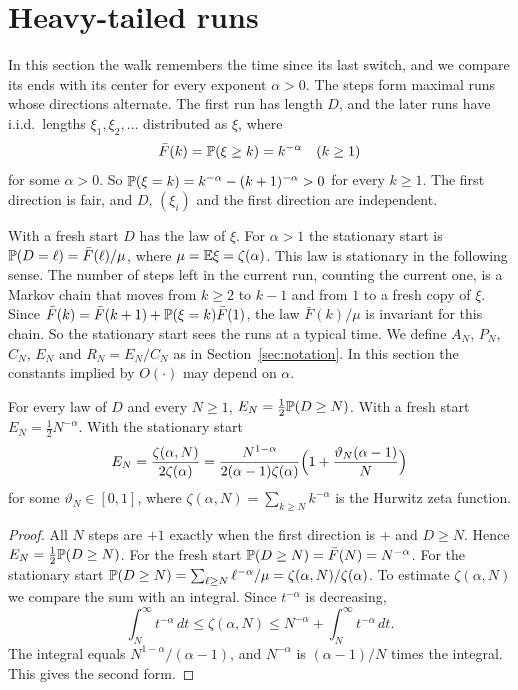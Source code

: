 \section{Heavy-tailed runs}\label{sec:heavy}

In this section the walk remembers the time since its last switch, and we
compare its ends with its center for every exponent $\alpha>0$. The steps
form maximal runs whose directions alternate. The first run has length $D$,
and the later runs have i.i.d.\ lengths $\xi_1,\xi_2,\dots$ distributed as
$\xi$, where
\[
 \bar F(k)=\mathbb{P}(\xi\ge k)=k^{-\alpha}\quad(k\ge1)
\]
for some $\alpha>0$. So $\mathbb{P}(\xi=k)=k^{-\alpha}-(k+1)^{-\alpha}>0$ for every
$k\ge1$. The first direction is fair, and $D$, $(\xi_i)$ and the first
direction are independent.

With a fresh start $D$ has the law of $\xi$. For
$\alpha>1$ the stationary start is $\mathbb{P}(D=\ell)=\bar F(\ell)/\mu$, where
$\mu=\mathbb{E}\xi=\zeta(\alpha)$. This law is stationary in the following sense. The
number of steps left in the current run, counting the current one, is a Markov
chain that moves from $k\ge2$ to $k-1$ and from $1$ to a fresh copy of $\xi$.
Since $\bar F(k)=\bar F(k+1)+\mathbb{P}(\xi=k)\bar F(1)$, the law $\bar F(k)/\mu$
is invariant for this chain. So the stationary start sees the runs at a
typical time. We define $A_N$, $P_N$, $C_N$, $E_N$ and $R_N=E_N/C_N$ as in
Section~\ref{sec:notation}. In this section the constants implied by
$O(\cdot)$ may depend on $\alpha$.

\begin{proposition}\label{prop:edge}
For every law of $D$ and every $N\ge1$, $E_N=\frac12\mathbb{P}(D\ge N)$. With a fresh start
$E_N=\frac12N^{-\alpha}$. With the stationary start
\[
 E_N=\frac{\zeta(\alpha,N)}{2\zeta(\alpha)}
 =\frac{N^{1-\alpha}}{2(\alpha-1)\zeta(\alpha)}\Bigl(1+\frac{\vartheta_N(\alpha-1)}N\Bigr)
\]
for some $\vartheta_N\in[0,1]$, where $\zeta(\alpha,N)=\sum_{k\ge N}k^{-\alpha}$
is the Hurwitz zeta function.
\end{proposition}

\begin{proof}
All $N$ steps are $+1$ exactly when the first direction is $+$ and $D\ge N$.
Hence $E_N=\frac12\mathbb{P}(D\ge N)$. For the fresh start
$\mathbb{P}(D\ge N)=\bar F(N)=N^{-\alpha}$. For the stationary start
$\mathbb{P}(D\ge N)=\sum_{\ell\ge N}\ell^{-\alpha}/\mu=\zeta(\alpha,N)/\zeta(\alpha)$.
To estimate $\zeta(\alpha,N)$ we compare the sum with an integral. Since
$t^{-\alpha}$ is decreasing,
\[
 \int_N^\infty t^{-\alpha}\,dt\le\zeta(\alpha,N)\le N^{-\alpha}+\int_N^\infty
 t^{-\alpha}\,dt .
\]
The integral equals $N^{1-\alpha}/(\alpha-1)$, and $N^{-\alpha}$ is
$(\alpha-1)/N$ times the integral. This gives the second form.
\end{proof}

